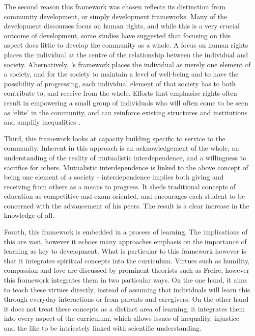 The second reason this framework was chosen reflects its distinction from community development, or simply development frameworks. Many of the development discourses focus on human rights, and while this is a very crucial outcome of development, some studies have suggested that focusing on this aspect does little to develop the community as a whole. A focus on human rights places the individual at the centre of the relationship between the individual and society. Alternatively, \citeauthor{Karlberg2016}'s framework places the individual as merely one element of a society, and for the society to maintain a level of well-being and to have the possibility of progressing, each individual element of that society has to both contribute to, and receive from the whole. Efforts that emphasise rights often result in empowering a small group of individuals who will often come to be seen as `elite' in the community, and can reinforce existing structures and institutions and amplify inequalities \citep[see for example][]{Honeyman2010}. 

Third, this framework looks at capacity building specific to service to the community. Inherent in this approach is an acknowledgement of the whole, an understanding of the reality of mutualistic interdependence, and a willingness to sacrifice for others. Mutualistic interdependence is linked to the above concept of being one element of a society - interdependence implies both giving and receiving from others as a means to progress. It sheds traditional concepts of education as competitive and exam oriented, and encourages each student to be concerned with the advancement of his peers. The result is a clear increase in the knowledge of all. 

Fourth, this framework is embedded in a process of learning. The implications of this are vast, however it echoes many approaches emphasis on the importance of learning as key to development. What is particular to this framework however is that it integrates spiritual concepts into the curriculum. Virtues such as humility, compassion and love are discussed by prominent theorists such as Freire, however this framework integrates them in two particular ways. On the one hand, it aims to teach these virtues directly, instead of assuming that individuals will learn this through everyday interactions or from parents and caregivers. On the other hand it does not treat these concepts as a distinct area of learning, it integrates them into every aspect of the curriculum, which allows issues of inequality, injustice and the like to be intricately linked with scientific understanding. 


